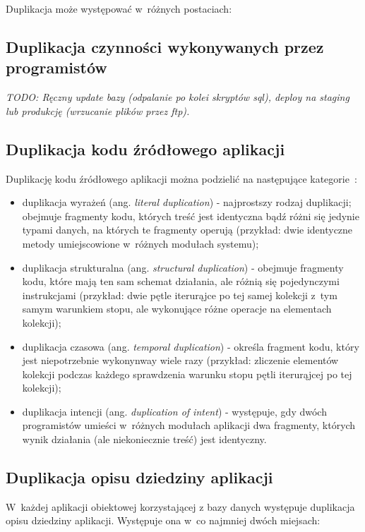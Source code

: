 Duplikacja może występować w~różnych postaciach:


\subsection{Duplikacja czynności wykonywanych przez programistów}
\emph{TODO: Ręczny update bazy (odpalanie po kolei skryptów sql), deploy na staging lub produkcję (wrzucanie plików przez ftp).}


\subsection{Duplikacja kodu źródłowego aplikacji}

Duplikację kodu źródłowego aplikacji można podzielić na następujące kategorie~\cite{soft:sol:dupl}:

\begin{itemize}
 \item duplikacja wyrażeń (ang. \emph{literal duplication}) - najprostszy rodzaj duplikacji; obejmuje fragmenty kodu, których treść jest identyczna bądź różni się jedynie typami danych, na których te fragmenty operują (przykład: dwie identyczne metody umiejscowione w~różnych modułach systemu); 
 \item duplikacja strukturalna (ang. \emph{structural duplication}) - obejmuje fragmenty kodu, które mają ten sam schemat działania, ale różnią się pojedynczymi instrukcjami (przykład: dwie pętle iterurąjce po tej samej kolekcji z~tym samym warunkiem stopu, ale wykonujące różne operacje na elementach kolekcji);
 \item duplikacja czasowa (ang. \emph{temporal duplication}) - określa fragment kodu, który jest niepotrzebnie wykonynway wiele razy (przykład: zliczenie elementów kolekcji podczas każdego sprawdzenia warunku stopu pętli iterurąjcej po tej kolekcji);
 \item duplikacja intencji (ang. \emph{duplication of intent}) - występuje, gdy dwóch programistów umieści w~różnych modułach aplikacji dwa fragmenty, których wynik działania (ale niekoniecznie treść) jest identyczny.
\end{itemize}


\subsection{Duplikacja opisu dziedziny aplikacji}

W~każdej aplikacji obiektowej korzystającej z bazy danych występuje duplikacja opisu dziedziny aplikacji.
Występuje ona w~co najmniej dwóch miejsach:

